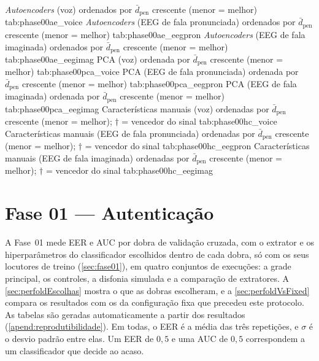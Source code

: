 		{\textit{Autoencoders} (voz) ordenados por $\bar{d}_{\text{pen}}$ crescente (menor = melhor)}%
		{tab:phase00ae_voice}
		{\textit{Autoencoders} (EEG de fala pronunciada) ordenados por $\bar{d}_{\text{pen}}$ crescente (menor = melhor)}%
		{tab:phase00ae_eegpron}
		{\textit{Autoencoders} (EEG de fala imaginada) ordenados por $\bar{d}_{\text{pen}}$ crescente (menor = melhor)}%
		{tab:phase00ae_eegimag}
		{PCA (voz) ordenada por $\bar{d}_{\text{pen}}$ crescente (menor = melhor)}%
		{tab:phase00pca_voice}
		{PCA (EEG de fala pronunciada) ordenada por $\bar{d}_{\text{pen}}$ crescente (menor = melhor)}%
		{tab:phase00pca_eegpron}
		{PCA (EEG de fala imaginada) ordenada por $\bar{d}_{\text{pen}}$ crescente (menor = melhor)}%
		{tab:phase00pca_eegimag}
		{Características manuais (voz) ordenadas por $\bar{d}_{\text{pen}}$ crescente (menor = melhor); $\dagger$ = vencedor do sinal}%
		{tab:phase00hc_voice}
		{Características manuais (EEG de fala pronunciada) ordenadas por $\bar{d}_{\text{pen}}$ crescente (menor = melhor); $\dagger$ = vencedor do sinal}%
		{tab:phase00hc_eegpron}
		{Características manuais (EEG de fala imaginada) ordenadas por $\bar{d}_{\text{pen}}$ crescente (menor = melhor); $\dagger$ = vencedor do sinal}%
		{tab:phase00hc_eegimag}

	\section{Fase 01 --- Autenticação}
	\label{chap:testsResults:sec:Fase01}

	\par A Fase~01 mede \ac{EER} e \ac{AUC} por dobra de validação cruzada, com
	o extrator e os hiperparâmetros do classificador escolhidos dentro de cada
	dobra, só com os seus locutores de treino (\autoref{sec:fase01}), em quatro
	conjuntos de execuções: a grade principal, os controles, a disfonia simulada
	e a comparação de extratores. A \autoref{sec:perfoldEscolhas} mostra o que as
	dobras escolheram, e a \autoref{sec:perfoldVsFixed} compara os resultados com
	os da configuração fixa que precedeu este protocolo. As tabelas são geradas
	automaticamente a partir dos resultados (\autoref{apend:reprodutibilidade}).
	Em todas, o \ac{EER} é a média das três repetições, e $\sigma$ é o desvio
	padrão entre elas. Um \ac{EER} de $0{,}5$ e uma \ac{AUC} de $0{,}5$
	correspondem a um classificador que decide ao acaso.

